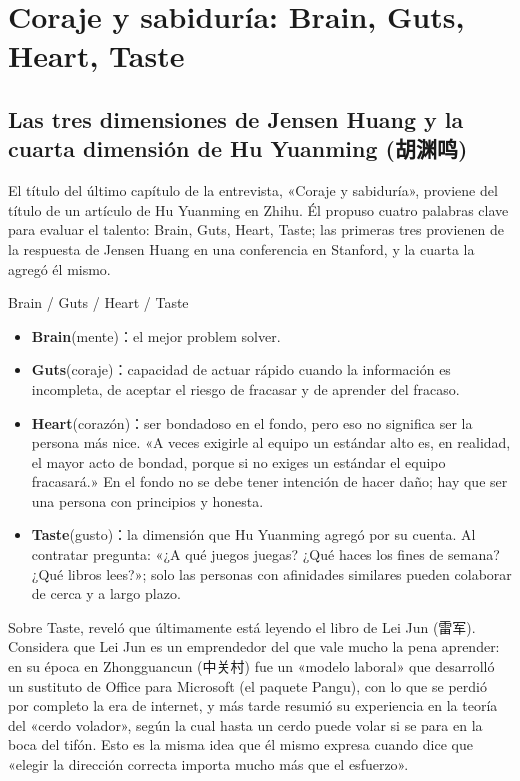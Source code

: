 \section{Coraje y sabiduría: Brain, Guts, Heart, Taste}

\subsection{Las tres dimensiones de Jensen Huang y la cuarta dimensión de Hu Yuanming (胡渊鸣)}

El título del último capítulo de la entrevista, «Coraje y sabiduría», proviene del título de un artículo de Hu Yuanming en Zhihu. Él propuso cuatro palabras clave para evaluar el talento: Brain, Guts, Heart, Taste; las primeras tres provienen de la respuesta de Jensen Huang en una conferencia en Stanford, y la cuarta la agregó él mismo.

\begin{importantbox}{{Brain / Guts / Heart / Taste}}
\begin{itemize}
\item \textbf{Brain}(mente)：el mejor problem solver.
\item \textbf{Guts}(coraje)：capacidad de actuar rápido cuando la información es incompleta, de aceptar el riesgo de fracasar y de aprender del fracaso.
\item \textbf{Heart}(corazón)：ser bondadoso en el fondo, pero eso no significa ser la persona más nice. «A veces exigirle al equipo un estándar alto es, en realidad, el mayor acto de bondad, porque si no exiges un estándar el equipo fracasará.» En el fondo no se debe tener intención de hacer daño; hay que ser una persona con principios y honesta.
\item \textbf{Taste}(gusto)：la dimensión que Hu Yuanming agregó por su cuenta. Al contratar pregunta: «¿A qué juegos juegas? ¿Qué haces los fines de semana? ¿Qué libros lees?»; solo las personas con afinidades similares pueden colaborar de cerca y a largo plazo.
\end{itemize}
\end{importantbox}

Sobre Taste, reveló que últimamente está leyendo el libro de Lei Jun (雷军). Considera que Lei Jun es un emprendedor del que vale mucho la pena aprender: en su época en Zhongguancun (中关村) fue un «modelo laboral» que desarrolló un sustituto de Office para Microsoft (el paquete Pangu), con lo que se perdió por completo la era de internet, y más tarde resumió su experiencia en la teoría del «cerdo volador», según la cual hasta un cerdo puede volar si se para en la boca del tifón. Esto es la misma idea que él mismo expresa cuando dice que «elegir la dirección correcta importa mucho más que el esfuerzo».

